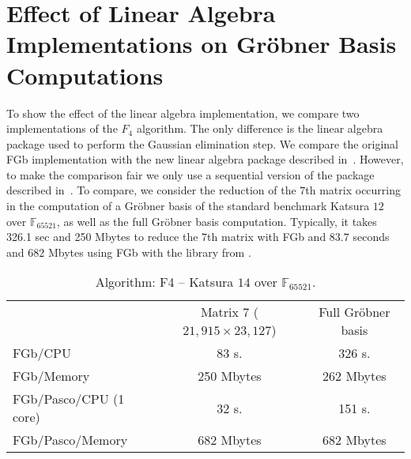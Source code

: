 \documentclass[preprint,draft]{elsarticle}
\newcommand{\F}{{\mathbb F}}
\begin{document}
\section{Effect of Linear Algebra Implementations on Gr{\"o}bner Basis Computations}
\label{app:timings}
To show the effect of the linear algebra implementation, we compare two implementations of the $F_4$ algorithm. The only difference is the linear algebra package used to perform the Gaussian elimination step. We compare the original FGb implementation with the new linear algebra package described in~\cite{FL10b}. However, to make the comparison fair we only use a sequential version of the package described in~\cite{FL10b}. To compare, we consider the  reduction  of the $7$th matrix occurring in the computation of a Gr\"obner basis of the standard benchmark Katsura $12$ over $\F_{65521}$, as well as the full Gr\"obner basis computation.  Typically, it takes 326.1 sec and 250 Mbytes to reduce the $7$th matrix with FGb and $83.7$ seconds and $682$ Mbytes using FGb with the library from \cite{FL10b}.
\begin{table}[ht]
\begin{center}
\begin{scriptsize}
\caption{Algorithm: F4 -- Katsura $14$ over $\F_{65521}$.}
  \begin{tabular}{lcc}
    \hline
                        &       Matrix 7 ($21,915 \times 23,127$)       &  Full Gr\"obner basis \\
FGb/CPU         &               83 s.           &       326 s. \\
FGb/Memory              &               250 Mbytes              &       262 Mbytes\\
FGb/Pasco/CPU  \cite{FL10b} (1 core) &          32 s.   &               151 s.\\
FGb/Pasco/Memory \cite{FL10b}                     &     682 Mbytes        &              682 Mbytes\\
    \hline
\end{tabular}
\end{scriptsize}
\end{center}
\end{table}
\end{document}
